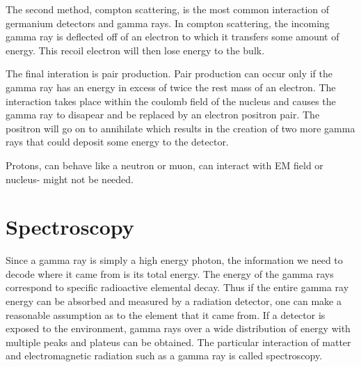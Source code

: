 The second method, compton scattering, is the most common interaction of germanium detectors and gamma rays.
In compton scattering, the incoming gamma ray is deflected off of an electron to which it transfers some amount of energy.
This recoil electron will then lose energy to the bulk.

The final interation is pair production.
Pair production can occur only if the gamma ray has an energy in excess of twice the rest mass of an electron.
The interaction takes place within the coulomb field of the nucleus and causes the gamma ray to disapear and be replaced by an electron positron pair.
The positron will go on to annihilate which results in the creation of two more gamma rays that could deposit some energy to the detector.

Protons, can behave like a neutron or muon, can interact with EM field or nucleus- might not be needed.

\section{Spectroscopy}
Since a gamma ray is simply a high energy photon, the information we need to decode where it came from is its total energy.
The energy of the gamma rays correspond to specific radioactive elemental decay.
Thus if the entire gamma ray energy can be absorbed and measured by a radiation detector, one can make a reasonable assumption as to the element that it came from.
If a detector is exposed to the environment, gamma rays over a wide distribution of energy with multiple peaks and plateus can be obtained.
The particular interaction of matter and electromagnetic radiation such as a gamma ray is called spectroscopy.

